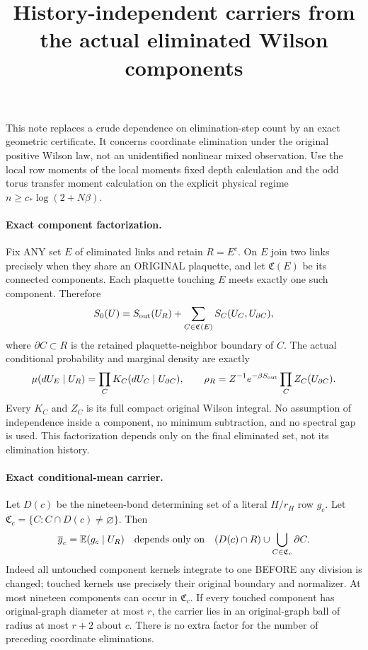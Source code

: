 \documentclass[11pt]{article}
\title{History-independent carriers from the actual eliminated Wilson components}\author{}\date{}
\newcommand{\E}{\mathbb E}
\begin{document}
\maketitle
This note replaces a crude dependence on elimination-step count by an exact geometric
certificate. It concerns coordinate elimination under the original positive Wilson law,
not an unidentified nonlinear mixed observation. Use the local row moments of the local moments fixed depth calculation and the odd torus transfer moment calculation
on the explicit physical regime $n\ge c_*\log(2+N\beta)$.

\paragraph{Exact component factorization.}
Fix ANY set $E$ of eliminated links and retain $R=E^c$.
On $E$ join two links precisely when they share an ORIGINAL plaquette, and let
$\mathfrak C(E)$ be its connected components. Each plaquette touching $E$ meets exactly
one such component. Therefore
\[
 S_0(U)=S_{\rm out}(U_R)+\sum_{C\in\mathfrak C(E)}S_C(U_C,U_{\partial C}),
\]
where $\partial C\subset R$ is the retained plaquette-neighbor boundary of $C$.
The actual conditional probability and marginal density are exactly
\[
 \mu(dU_E\mid U_R)=\prod_C K_C(dU_C\mid U_{\partial C}),\qquad
 \rho_R=Z^{-1}e^{-\beta S_{\rm out}}\prod_C Z_C(U_{\partial C}).
\]
Every $K_C$ and $Z_C$ is its full compact original Wilson integral. No assumption of
independence inside a component, no minimum subtraction, and no spectral gap is used.
This factorization depends only on the final eliminated set, not its elimination history.

\paragraph{Exact conditional-mean carrier.}
Let $D(c)$ be the nineteen-bond determining set of a literal $H/r_H$ row $g_c$.
Let $\mathfrak C_c=\{C:C\cap D(c)\ne\varnothing\}$. Then
\[
 \overline g_c=\E(g_c\mid U_R)
\quad\hbox{depends only on}\quad
 (D(c)\cap R)\cup\bigcup_{C\in\mathfrak C_c}\partial C.
\]
Indeed all untouched component kernels integrate to one BEFORE any division is changed;
touched kernels use precisely their original boundary and normalizer.
At most nineteen components can occur in $\mathfrak C_c$.
If every touched component has original-graph diameter at most $r$, the carrier lies in
an original-graph ball of radius at most $r+2$ about $c$. There is no extra factor for the
number of preceding coordinate eliminations.
\end{document}
